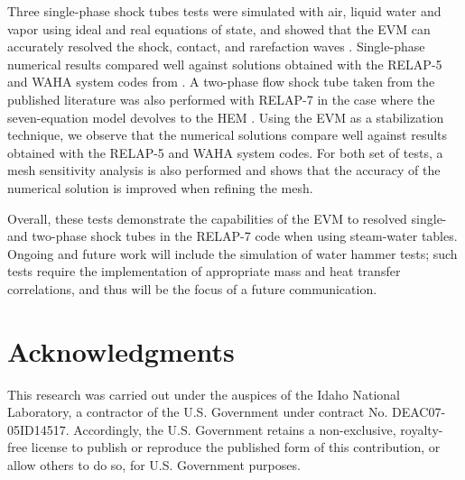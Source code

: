 \documentclass{inputs/mc2015}
\begin{document}
Three single-phase shock tubes tests were simulated with air, liquid water and vapor using ideal and real equations of state, and showed that the EVM can accurately resolved the shock, contact, and rarefaction waves  . Single-phase numerical results compared well against solutions obtained with the RELAP-5 and WAHA system codes from \cite{Sokolowski-Koszela}. A two-phase flow shock tube taken from the published literature was also performed with RELAP-7 in the case where the seven-equation model devolves to the HEM  . Using the EVM as a stabilization technique, we observe that the numerical solutions compare well against results obtained with the RELAP-5 and WAHA system codes. For both set of tests, a mesh sensitivity analysis is also performed and shows that the accuracy of the numerical solution is improved when refining the mesh. 

Overall, these tests demonstrate the capabilities of the EVM to resolved single- and two-phase shock tubes in the RELAP-7 code when using steam-water tables. Ongoing and future work will include the simulation of water hammer tests; such tests require the implementation of appropriate mass and heat transfer correlations, and thus will be the focus of a future communication.

\section{Acknowledgments}

This research was carried out under the auspices of the Idaho National Laboratory, a contractor of the U.S. Government under contract No. DEAC07-05ID14517.  Accordingly, the U.S. Government retains a non-exclusive, royalty-free license to publish or reproduce the published form of this contribution, or allow others to do so, for U.S. Government purposes.
 

\setlength{\baselineskip}{12pt}



\end{document}
